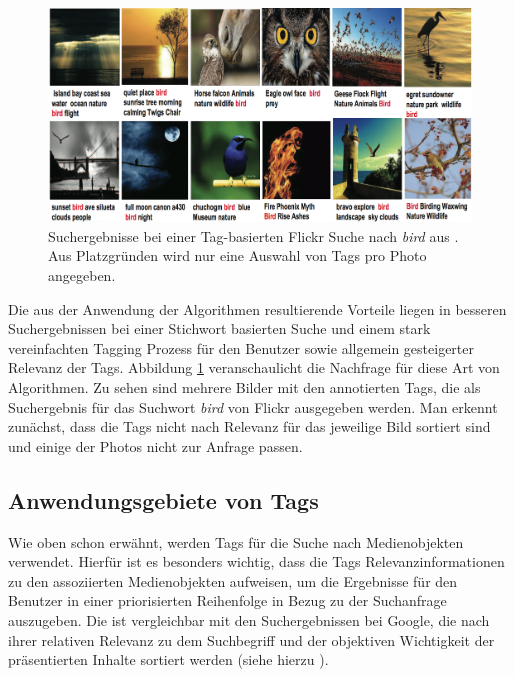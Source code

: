 \begin{figure}[htbp]
  \centering
    \includegraphics[height=0.5\textwidth]{images/bird_search_results_wide.png}
  \caption{Suchergebnisse bei einer Tag-basierten Flickr Suche nach \emph{bird} aus \cite{ranking}. Aus Platzgründen wird nur eine Auswahl von Tags pro Photo angegeben.}
  \label{fig:images_bird_search_results}
\end{figure}

Die aus der Anwendung der Algorithmen resultierende Vorteile liegen in besseren Suchergebnissen bei einer Stichwort basierten Suche und einem stark vereinfachten Tagging Prozess für den Benutzer sowie allgemein gesteigerter Relevanz der Tags. Abbildung \ref{fig:images_bird_search_results} veranschaulicht die Nachfrage für diese Art von Algorithmen. Zu sehen sind mehrere Bilder mit den annotierten Tags, die als Suchergebnis für das Suchwort \emph{bird} von Flickr ausgegeben werden. Man erkennt zunächst, dass die Tags nicht nach Relevanz für das jeweilige Bild sortiert sind und einige der Photos nicht zur Anfrage passen.



\subsection{Anwendungsgebiete von Tags} %
\label{sub:anwendungsgebiete}

Wie oben schon erwähnt, werden Tags für die Suche nach Medienobjekten verwendet. Hierfür ist es besonders wichtig, dass die Tags Relevanzinformationen zu den assoziierten Medienobjekten aufweisen, um die Ergebnisse für den Benutzer in einer priorisierten Reihenfolge in Bezug zu der Suchanfrage auszugeben. Die ist vergleichbar mit den Suchergebnissen bei Google, die nach ihrer relativen Relevanz zu dem Suchbegriff und der objektiven Wichtigkeit der präsentierten Inhalte sortiert werden (siehe hierzu \cite{googlePageRank}).

